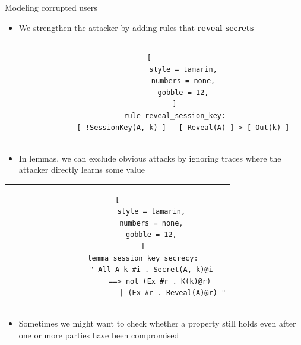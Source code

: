 \documentclass[11pt,aspectratio=169]{beamer}
\begin{document}
\begin{frame}[fragile]{Modeling corrupted users}
    \begin{itemize}
        \item We strengthen the attacker by adding rules that
              \textbf{reveal secrets}
    \end{itemize}
    \begin{center}
        \begin{tabular}{c}
            \begin{lstlisting}[
                style = tamarin,
                numbers = none,
                gobble = 12,
            ]
            rule reveal_session_key:
                [ !SessionKey(A, k) ] --[ Reveal(A) ]-> [ Out(k) ]
            \end{lstlisting}
        \end{tabular}
    \end{center}
    \begin{itemize}
        \item In lemmas, we can exclude obvious attacks by ignoring traces 
              where the attacker directly learns some value
    \end{itemize}
    \begin{center}
        \begin{tabular}{c}
            \begin{lstlisting}[
                style = tamarin,
                numbers = none,
                gobble = 12,
            ]
            lemma session_key_secrecy:
                " All A k #i . Secret(A, k)@i
                    ==> not (Ex #r . K(k)@r)
                          | (Ex #r . Reveal(A)@r) "
            \end{lstlisting}
        \end{tabular}
    \end{center}
    \begin{itemize}
        \item Sometimes we might want to check whether a property still holds 
              even after one or more parties have been compromised
    \end{itemize}
\end{frame}
\end{document}

